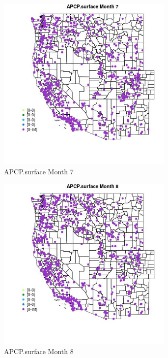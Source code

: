 \begin{figure} 
\centering  
\includegraphics[width=0.77\textwidth]{Code_Outputs/Report_ML_input_PM25_Step4_part_e_de_duplicated_aves_compiled_2019-05-21wNAs_MapObsMo7APCPsurface.jpg} 
\caption{\label{fig:Report_ML_input_PM25_Step4_part_e_de_duplicated_aves_compiled_2019-05-21wNAsMapObsMo7APCPsurface}APCP.surface Month 7} 
\end{figure} 
 

\begin{figure} 
\centering  
\includegraphics[width=0.77\textwidth]{Code_Outputs/Report_ML_input_PM25_Step4_part_e_de_duplicated_aves_compiled_2019-05-21wNAs_MapObsMo8APCPsurface.jpg} 
\caption{\label{fig:Report_ML_input_PM25_Step4_part_e_de_duplicated_aves_compiled_2019-05-21wNAsMapObsMo8APCPsurface}APCP.surface Month 8} 
\end{figure} 
 

